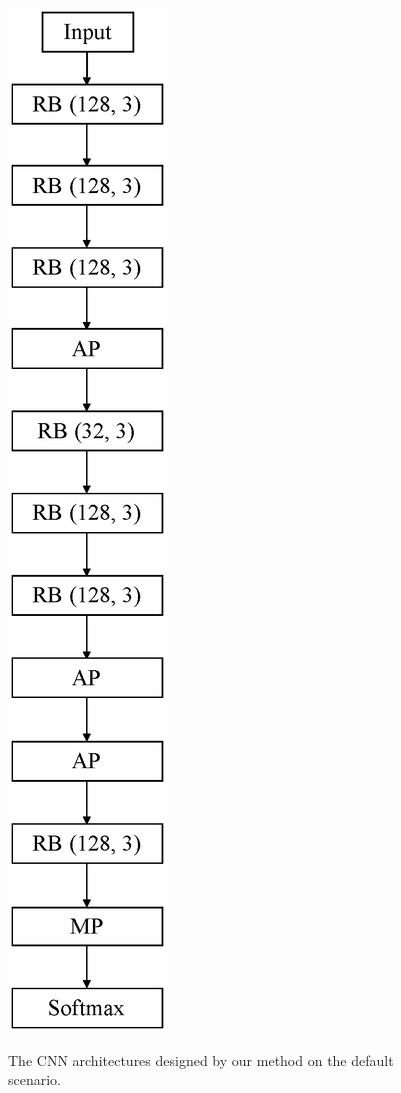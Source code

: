 \begin{figure}[!t]
\begin{minipage}[b]{0.45\linewidth}
  \includegraphics[keepaspectratio, scale=0.4]{images/modelB.eps}
  \label{modelB}
 \end{minipage}
 \caption{The CNN architectures designed by our method on the default scenario.}\label{models}
\end{figure}

